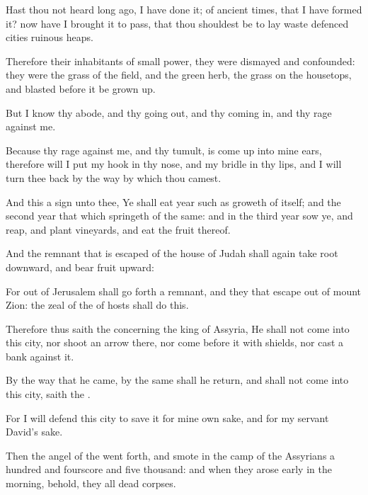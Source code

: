 {Hast thou not
heard long
ago,
{} I have
done it;
{} of
ancient
times, that I have
formed it? now have I
brought it to pass, that thou shouldest be to lay
waste
defenced
cities
{}
ruinous
heaps.

Therefore their
inhabitants
{} of
small
power, they were
dismayed and
confounded: they were
{} the
grass of the
field, and
{} the
green
herb,
{} the
grass on the
housetops, and
{}
blasted
before it be grown
up.

But I
know thy
abode, and thy going
out, and thy coming
in, and thy
rage against me.

Because thy
rage against me, and thy
tumult, is come
up into mine
ears, therefore will I
put my
hook in thy
nose, and my
bridle in thy
lips, and I will turn thee
back by the
way by which thou
camest.

And this
{} a
sign unto thee, Ye shall
eat
{}
year such as
groweth of itself; and the
second
year that which
springeth of the same: and in the
third
year
sow ye, and
reap, and
plant
vineyards, and
eat the
fruit thereof.

And the
remnant that is
escaped of the
house of
Judah shall
again take
root
downward, and
bear
fruit
upward:

For out of
Jerusalem shall go
forth a
remnant, and they that
escape out of
mount
Zion: the
zeal of the
{} of
hosts shall
do this.

Therefore thus
saith the
{} concerning the
king of
Assyria, He shall not
come into this
city, nor
shoot an
arrow there, nor come
before it with
shields, nor
cast a
bank against it.

By the
way that he
came, by the same shall he
return, and shall not
come into this
city,
saith the
{}.

For I will
defend this
city to
save it for mine own sake, and for my
servant
David’s sake.

Then the
angel of the
{} went
forth, and
smote in the
camp of the
Assyrians a
hundred and
fourscore and
five
thousand: and when they arose
early in the
morning, behold, they
{} all
dead
corpses.


}
